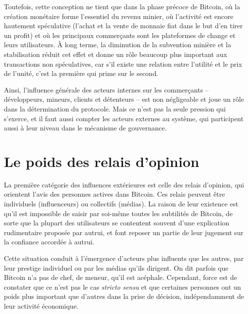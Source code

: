 Toutefois, cette conception ne tient que dans la phase précoce de Bitcoin, où la création monétaire forme l'essentiel du revenu minier, où l'activité est encore hautement spéculative (l'achat et la vente de monnaie fiat dans le but d'en tirer un profit) et où les principaux commerçants sont les plateformes de change et leurs utilisateurs. À long terme, la diminution de la subvention minière et la stabilisation réduit cet effet et donne un rôle beaucoup plus important aux transactions non spéculatives, car s'il existe une relation entre l'utilité et le prix de l'unité, c'est la première qui prime sur le second.

Ainsi, l'influence générale des acteurs internes sur les commerçants -- développeurs, mineurs, clients et détenteurs -- est non négligeable et joue un rôle dans la détermination du protocole. Mais ce n'est pas la seule pression qui s'exerce, et il faut aussi compter les acteurs externes au système, qui participent aussi à leur niveau dans le mécanisme de gouvernance.

\vspace{-1em}
\section*{Le poids des relais d'opinion} %

La première catégorie des influences extérieures est celle des relais d'opinion, qui orientent l'avis des personnes actives dans Bitcoin. Ces relais peuvent être individuels (influenceurs) ou collectifs (médias). La raison de leur existence est qu'il est impossible de saisir par soi-même toutes les subtilités de Bitcoin, de sorte que la plupart des utilisateurs se contentent souvent d'une explication rudimentaire proposée par autrui, et font reposer un partie de leur jugement sur la confiance accordée à autrui.

Cette situation conduit à l'émergence d'acteurs plus influents que les autres, par leur prestige individuel ou par les médias qu'ils dirigent. On dit parfois que Bitcoin n'a pas de chef, de meneur, qu'il est acéphale. Cependant, force est de constater que ce n'est pas le cas \emph{stricto sensu} et que certaines personnes ont un poids plus important que d'autres dans la prise de décision, indépendamment de leur activité économique.

